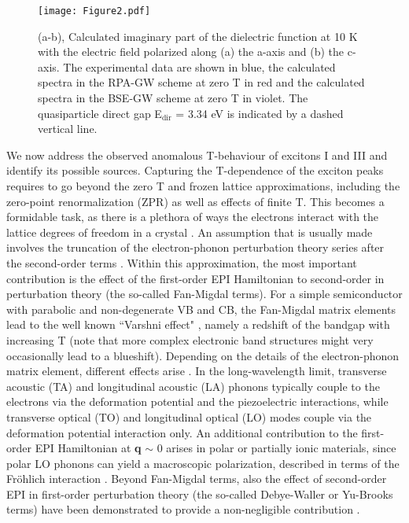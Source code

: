 \documentclass[aps,prl,twocolumn,amsfonts,nobibnotes,superscriptaddress,showpacs]{revtex4-1}
\begin{document}
\begin{figure}[t]
\begin{center}
\texttt{[image: Figure2.pdf]}
\caption{(a-b), Calculated imaginary part of the dielectric function at 10 K with the electric field polarized along (a) the a-axis and (b) the c-axis. The experimental data are shown in blue, the calculated spectra in the RPA-GW scheme at zero T in red and the calculated spectra in the BSE-GW scheme at zero T in violet. The quasiparticle direct gap E$\mathrm{_{dir}}$ = 3.34 eV is indicated by a dashed vertical line.}
\label{fig:Fig2}
\end{center}
\end{figure}

We now address the observed anomalous T-behaviour of excitons I and III and identify its possible sources. Capturing the T-dependence of the exciton peaks requires to go beyond the zero T and frozen lattice approximations, including the zero-point renormalization (ZPR) as well as effects of finite T. This becomes a formidable task, as there is a plethora of ways the electrons interact with the lattice degrees of freedom in a crystal \cite{yucardona, giustino}. An assumption that is usually made involves the truncation of the electron-phonon perturbation theory series after the second-order terms \cite{cardona2001renormalization}. Within this approximation, the most important contribution is the effect of the first-order EPI Hamiltonian to second-order in perturbation theory (the so-called Fan-Migdal terms). For a simple semiconductor with parabolic and non-degenerate VB and CB, the Fan-Migdal matrix elements lead to the well known ``Varshni effect" \cite{varshni1967temperature}, namely a redshift of the bandgap with increasing T (note that more complex electronic band structures might very occasionally lead to a blueshift). Depending on the details of the electron-phonon matrix element, different effects arise \cite{yucardona}. In the long-wavelength limit, transverse acoustic (TA) and longitudinal acoustic (LA) phonons typically couple to the electrons via the deformation potential and the piezoelectric interactions, while transverse optical (TO) and longitudinal optical (LO) modes couple via the deformation potential interaction only. An additional contribution to the first-order EPI Hamiltonian at \textbf{q} $\sim$ 0 arises in polar or partially ionic materials, since polar LO phonons can yield a macroscopic polarization, described in terms of the Fr\"ohlich interaction \cite{frohlich1950xx}. Beyond Fan-Migdal terms, also the effect of second-order EPI in first-order perturbation theory (the so-called Debye-Waller or Yu-Brooks terms) have been demonstrated to provide a non-negligible contribution \cite{allen1981theory}.
\end{document}
